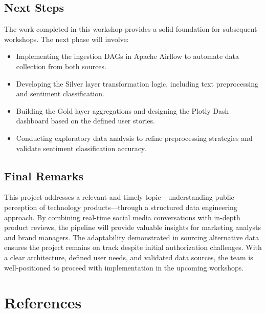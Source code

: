 \documentclass[12pt]{article}
\begin{document}
\subsection{Next Steps}
The work completed in this workshop provides a solid foundation for subsequent workshops. The next phase will involve:
\begin{itemize}
    \item Implementing the ingestion DAGs in Apache Airflow to automate data collection from both sources.
    \item Developing the Silver layer transformation logic, including text preprocessing and sentiment classification.
    \item Building the Gold layer aggregations and designing the Plotly Dash dashboard based on the defined user stories.
    \item Conducting exploratory data analysis to refine preprocessing strategies and validate sentiment classification accuracy.
\end{itemize}

\subsection{Final Remarks}
This project addresses a relevant and timely topic—understanding public perception of technology products—through a structured data engineering approach. By combining real-time social media conversations with in-depth product reviews, the pipeline will provide valuable insights for marketing analysts and brand managers. The adaptability demonstrated in sourcing alternative data ensures the project remains on track despite initial authorization challenges. With a clear architecture, defined user needs, and validated data sources, the team is well-positioned to proceed with implementation in the upcoming workshops.

\section{References}
\end{document}
